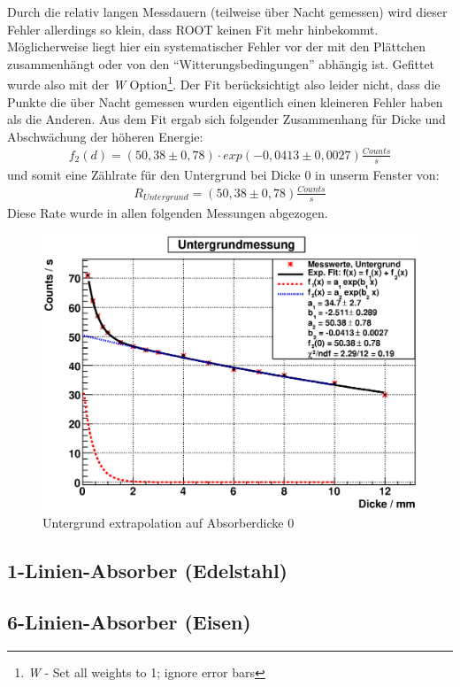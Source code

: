 \documentclass[12pt]{article}
\begin{document}
Durch die relativ langen Messdauern (teilweise über Nacht gemessen) wird dieser Fehler allerdings so klein, dass ROOT keinen Fit mehr hinbekommt.
Möglicherweise liegt hier ein systematischer Fehler vor der mit den Plättchen zusammenhängt oder von den ``Witterungsbedingungen'' abhängig ist.
Gefittet wurde also mit der \textit{W} Option\footnote{\textit{W} - Set all weights to 1; ignore error bars}. Der Fit berücksichtigt also leider nicht, dass die Punkte die über Nacht gemessen wurden eigentlich einen kleineren Fehler haben als die Anderen. Aus dem Fit ergab sich folgender Zusammenhang für Dicke und Abschwächung der höheren Energie:
\begin{align*}
 f_2 (d) = (50,38 \pm 0,78) \cdot exp (-0,0413 \pm 0,0027) \frac{Counts}{s}
\end{align*}
 und somit eine Zählrate für den Untergrund bei Dicke 0 in unserm Fenster von:
\begin{align*}
 R_{Untergrund} = (50,38 \pm 0,78) \frac{Counts}{s} 
\end{align*}
Diese Rate wurde in allen folgenden Messungen abgezogen.
       

\begin{figure}[H]
 \includegraphics[width=0.9\linewidth]{pictures/untergrund.eps}
 \caption{Untergrund extrapolation auf Absorberdicke 0}
\end{figure}

\subsection{1-Linien-Absorber (Edelstahl)}

\subsection{6-Linien-Absorber (Eisen)}
\end{document}
